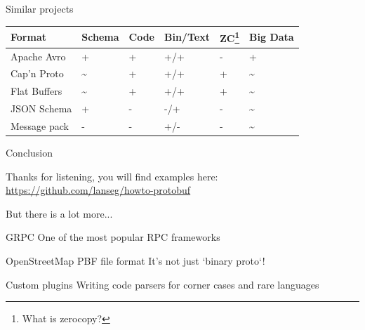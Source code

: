 \documentclass{beamer}
\begin{document}
\begin{frame}{Similar projects}
  \begin{center}
    \begin{tabular}{ l l l l l l }
      Format & Schema & Code & Bin/Text & ZC\footnote[1]{ What is zerocopy? }  & Big Data \\
      \hline
      Apache Avro & + & + & +/+ & - & + \\
      Cap'n Proto & \textasciitilde & + & +/+ & + & \textasciitilde \\
      Flat Buffers & \textasciitilde & + & +/+ & + & \textasciitilde \\
      JSON Schema & + & - & -/+ & - & \textasciitilde \\
      Message pack & - & - & +/- & - & \textasciitilde
    \end{tabular}
  \end{center}
\end{frame}

\begin{frame}{Conclusion}
\begin{center}
Thanks for listening, you will find examples here: \url{https://github.com/lanseg/howto-protobuf}

But there is a lot more...
\end{center}
\end{frame}

\begin{frame}{GRPC}
One of the most popular RPC frameworks
\end{frame}

\begin{frame}{OpenStreetMap PBF file format}
It's not just `binary proto`!
\end{frame}

\begin{frame}{Custom plugins}
Writing code parsers for corner cases and rare languages
\end{frame}
\end{document}
